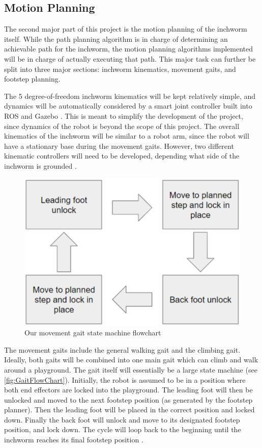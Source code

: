 \subsection{Motion Planning}
The second major part of this project is the motion planning of the inchworm itself. While the path planning algorithm is in charge of determining an achievable path for the inchworm, the motion planning algorithms implemented will be in charge of actually executing that path. This major task can further be split into three major sections: inchworm kinematics, movement gaits, and footstep planning.

The 5 degree-of-freedom inchworm kinematics will be kept relatively simple, and dynamics will be automatically considered by a smart joint controller built into ROS and Gazebo \cite{ROSControl}. This is meant to simplify the development of the project, since dynamics of the robot is beyond the scope of this project. The overall kinematics of the inchworm will be similar to a robot arm, since the robot will have a stationary base during the movement gaits. However, two different kinematic controllers will need to be developed, depending what side of the inchworm is grounded \cite{PlanarInchWormDesign}.

\begin{figure}[ht]
    \includegraphics[width=\linewidth]{figures/GaitFlowChart.png}
    \caption{Our movement gait state machine flowchart}
    \label{fig:GaitFlowChart}
\end{figure} 

The movement gaits include the general walking gait and the climbing gait. Ideally, both gaits will be combined into one main gait which can climb and walk around a playground. The gait itself will essentially be a large state machine (see \autoref{fig:GaitFlowChart}). Initially, the robot is assumed to be in a position where both end effectors are locked into the playground. The leading foot will then be unlocked and moved to the next footstep position (as generated by the footstep planner). Then the leading foot will be placed in the correct position and locked down. Finally the back foot will unlock and move to its designated footstep position, and lock down. The cycle will loop back to the beginning until the inchworm reaches its final footstep position \cite{InchwormLocomotion} \cite{GaitGeneration} \cite{LeggedRobotsNavPlanning}.

